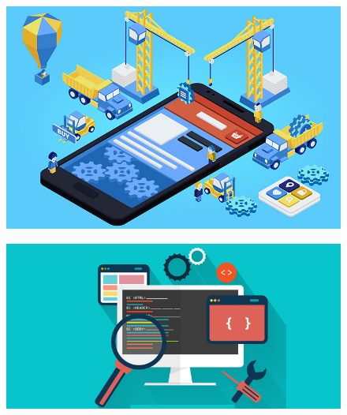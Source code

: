 \documentclass[12pt, letterpaper]{article}
\begin{document}
\begin{figure}[H]
  \raggedleft
  \includegraphics[scale=.22]{desarrolloApps}\\
\end{figure}

\begin{figure}[H]
  \raggedright
  \includegraphics[scale=.25]{desarrolloWeb}\\
\end{figure}
\end{document}
